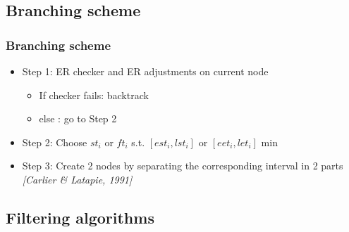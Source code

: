 \subsection{Branching scheme}

\begin{frame}
  \frametitle{Branching scheme }
  \begin{itemize}
    \vfill
  \item Step 1: ER checker and ER adjustments on current node 
    \begin{itemize}
    \item If checker fails: backtrack
    \item else : go to Step 2
    \end{itemize}
    \vfill    
    \pause
  \item Step 2: Choose $st_i$ or $ft_i$ s.t. $[est_i,lst_i]$ or
    $[eet_i,let_i]$ min
    \vfill
    \pause
  \item Step 3: Create 2 nodes by separating the corresponding
    interval in 2 parts  {\small \it \color{gray!50!black!50} [Carlier
      \& Latapie, 1991]} 
  \end{itemize}
  \begin{overlayarea}{\textwidth}{4cm}
  \end{overlayarea}
  \vfill
\end{frame}

\subsection{Filtering algorithms}

